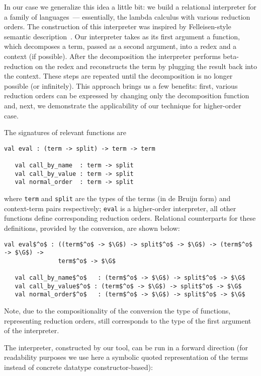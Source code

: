 In our case we generalize this idea a little bit: we build a relational interpreter for a family of languages~--- essentially, the lambda calculus with
various reduction orders. The construction of this interpreter was inspired by Felleisen-style semantic description~\cite{Felleisen}. 
Our interpreter takes as its first argument a function, which decomposes a term, passed as a second argument, into a redex and a context (if possible). 
After the decomposition the interpreter performs beta-reduction on the redex and reconstructs the term by plugging the result back into the context. 
These steps are repeated until the decomposition is no longer possible (or infinitely). This approach brings us a few benefits: first, various reduction orders can be 
expressed by changing only the decomposition function and, next, we demonstrate the applicability of our technique for higher-order case.

The signatures of relevant functions are

\begin{lstlisting}[basicstyle=\small]
   val eval : (term -> split) -> term -> term

   val call_by_name  : term -> split
   val call_by_value : term -> split
   val normal_order  : term -> split
\end{lstlisting}

\noindent where \lstinline|term| and \lstinline|split| are the types of the terms (in de Bruijn form) and context-term pairs respectively; \lstinline|eval| 
is a higher-order interpreter, all other functions define corresponding reduction orders. Relational counterparts for these definitions, provided 
by the conversion, are shown below:

\begin{lstlisting}[basicstyle=\small]
   val eval$^o$ : ((term$^o$ -> $\G$) -> split$^o$ -> $\G$) -> (term$^o$ -> $\G$) -> 
               term$^o$ -> $\G$

   val call_by_name$^o$   : (term$^o$ -> $\G$) -> split$^o$ -> $\G$
   val call_by_value$^o$ : (term$^o$ -> $\G$) -> split$^o$ -> $\G$
   val normal_order$^o$   : (term$^o$ -> $\G$) -> split$^o$ -> $\G$
\end{lstlisting}

Note, due to the compositionality of the conversion the type of functions, representing reduction orders, still corresponds to the type of the first 
argument of the interpreter.

The interpreter, constructed by our tool, can be run in a forward direction (for readability purposes we use here a symbolic quoted representation of
the terms instead of concrete datatype constructor-based):

